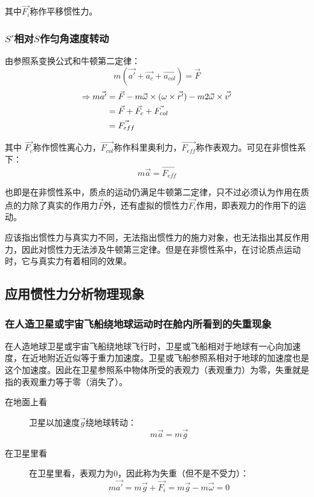 其中$\vec{F_i}$称作平移惯性力。
\subsubsection{$S'$相对$S$作匀角速度转动}由参照系变换公式和牛顿第二定律：
\[m(\vec{a'}+\vec{a_c}+\vec{a_{col}})=\vec{F}\]
\begin{align}
 \Rightarrow m\vec{a'}&=\vec{F}-m\vec{\omega}\times(\omega\times\vec{r'})-m2\vec{\omega}\times\vec{v'}\notag \\
 &=\vec{F}+\vec{F_c}+\vec{F_{col}}\notag \\
 &=\vec{F_{eff}} \notag
 \end{align}

其中 $\vec{F_c}$称作惯性离心力，$\vec{F_{col}}$称作科里奥利力，$\vec{F_{eff}}$称作表观力。可见在非惯性系下：\[ m\vec{a}=\vec{F_{eff}}\]

也即是在非惯性系中，质点的运动仍满足牛顿第二定律，只不过必须认为作用在质点的力除了真实的作用力$\vec{F}$外，还有虚拟的惯性力$\vec{F_i}$作用，即表观力的作用下的运动。

应该指出惯性力与真实力不同，无法指出惯性力的施力对象，也无法指出其反作用力，因此对惯性力无法涉及牛顿第三定律。但是在非惯性系中，在讨论质点运动时，它与真实力有着相同的效果。
\subsection{应用惯性力分析物理现象}
\subsubsection{在人造卫星或宇宙飞船绕地球运动时在舱内所看到的失重现象}
在人造地球卫星或宇宙飞船绕地球飞行时，卫星或飞船相对于地球有一心向加速度，在近地附近近似等于重力加速度。卫星或飞船参照系相对于地球的加速度也是这个加速度。因此在卫星参照系中物体所受的表观力（表观重力）为零，失重就是指的表观重力等于零（消失了）。
\begin{description}

\item[在地面上看]卫星以加速度$\vec{g}$绕地球转动：
\[m\vec{a}=m\vec{g}\]
\item[在卫星里看]在卫星里看，表观力为$0$，因此称为失重（但不是不受力）：
\[m\vec{a'}=m\vec{g}+\vec{F_i}=m\vec{g}-m\vec{\omega}=0\]
\end{description}
